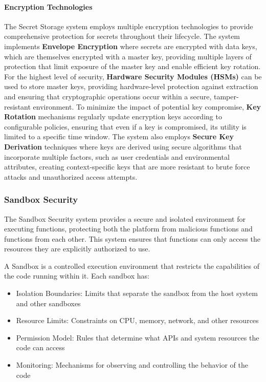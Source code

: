 \documentclass[12pt,a4paper]{article}
\begin{document}
\paragraph{Encryption Technologies}
The Secret Storage system employs multiple encryption technologies to provide comprehensive protection for secrets throughout their lifecycle. The system implements \textbf{Envelope Encryption} where secrets are encrypted with data keys, which are themselves encrypted with a master key, providing multiple layers of protection that limit exposure of the master key and enable efficient key rotation. For the highest level of security, \textbf{Hardware Security Modules (HSMs)} can be used to store master keys, providing hardware-level protection against extraction and ensuring that cryptographic operations occur within a secure, tamper-resistant environment. To minimize the impact of potential key compromise, \textbf{Key Rotation} mechanisms regularly update encryption keys according to configurable policies, ensuring that even if a key is compromised, its utility is limited to a specific time window. The system also employs \textbf{Secure Key Derivation} techniques where keys are derived using secure algorithms that incorporate multiple factors, such as user credentials and environmental attributes, creating context-specific keys that are more resistant to brute force attacks and unauthorized access attempts.

\subsubsection{Sandbox Security}
\label{subsubsec:sandbox}

The Sandbox Security system provides a secure and isolated environment for executing functions, protecting both the platform from malicious functions and functions from each other. This system ensures that functions can only access the resources they are explicitly authorized to use.



\begin{definition}[Sandbox]
A Sandbox is a controlled execution environment that restricts the capabilities of the code running within it. Each sandbox has:
\begin{itemize}
    \item Isolation Boundaries: Limits that separate the sandbox from the host system and other sandboxes
    \item Resource Limits: Constraints on CPU, memory, network, and other resources
    \item Permission Model: Rules that determine what APIs and system resources the code can access
    \item Monitoring: Mechanisms for observing and controlling the behavior of the code
\end{itemize}
\end{definition}
\end{document}
